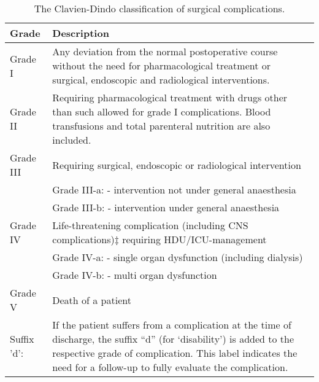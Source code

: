 \begin{sidewaystable}[htbp]
	\centering
	\caption{The Clavien-Dindo classification of surgical complications.}
	\label{table:clavien-dindo}	
	\renewcommand{\arraystretch}{1.7} %
	\setlength{\tabcolsep}{14pt} %
	\begin{tabular}{|l m{15cm}|}
		\hline
		Grade       & Description \\ \hline
		Grade I     & Any deviation from the normal postoperative course without the need for pharmacological treatment or surgical, endoscopic and radiological interventions.  \\
		Grade II    & Requiring pharmacological treatment with drugs other than such allowed for grade I complications. Blood transfusions and total parenteral nutrition are also included.  \\
		Grade III   & Requiring surgical, endoscopic or radiological intervention  \\
		            & Grade III-a: - intervention not under general anaesthesia \\
		            & Grade III-b: - intervention under general anaesthesia  \\
		Grade IV    & Life-threatening complication (including CNS complications)‡ requiring  HDU/ICU-management  \\
		            & Grade IV-a: - single organ dysfunction (including dialysis)     \\
		            & Grade IV-b: - multi organ dysfunction \\
		Grade V     & Death of a patient  \\ \hline
		Suffix 'd': & If the patient suffers from a complication at the time of discharge,  the suffix  “d”  (for ‘disability’) is added to the respective grade of complication. This label indicates the need for a follow-up to fully evaluate the complication. \\ \hline
	\end{tabular}
\end{sidewaystable}



 	
